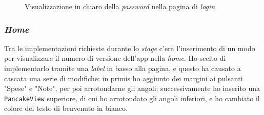 \begin{figure}[H]
\begin{subfigure}{.5\textwidth}
    \end{subfigure}
    \caption{Visualizzazione in chiaro della \textit{password} nella pagina di \textit{login}}
\end{figure}



\subsubsection{\textit{Home}}

Tra le implementazioni richieste durante lo \textit{stage} c'era l'inserimento di un modo per visualizzare il numero di versione dell'app nella \textit{home}. Ho scelto di implementarlo tramite una \textit{label} in basso alla pagina, e questo ha causato a cascata una serie di modifiche: in primis ho aggiunto dei margini ai pulsanti "Spese" e "Note", per poi arrotondarne gli angoli; successivamente ho inserito una \texttt{PancakeView} superiore, di cui ho arrotondato gli angoli inferiori, e ho cambiato il colore del testo di benvenuto in bianco.

